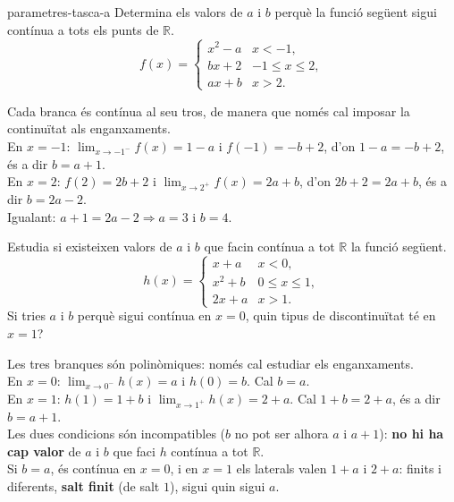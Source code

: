 \begin{apartats}

\begin{tria}{parametres-tasca-a}
Determina els valors de $a$ i $b$ perquè la funció següent sigui contínua a tots els
punts de $\mathbb{R}$.
\[
f(x)=\begin{cases}
  x^2-a & \si{x<-1},\\[3pt]
  bx+2  & \si{-1\le x\le 2},\\[3pt]
  ax+b  & \si{x>2}.
\end{cases}
\]

\begin{solucio}
Cada branca és contínua al seu tros, de manera que només cal imposar la continuïtat
als enganxaments.\\
En $x=-1$: $\lim_{x\to-1^-}f(x)=1-a$ i $f(-1)=-b+2$, d'on $1-a=-b+2$, és a dir $b=a+1$.\\
En $x=2$: $f(2)=2b+2$ i $\lim_{x\to2^+}f(x)=2a+b$, d'on $2b+2=2a+b$, és a dir $b=2a-2$.\\
Igualant: $a+1=2a-2\Rightarrow \boxed{a=3}$ i $\boxed{b=4}$.
\end{solucio}

Estudia si existeixen valors de $a$ i $b$ que facin contínua a tot $\mathbb{R}$ la funció
següent.
\[
h(x)=\begin{cases}
  x+a & \si{x<0},\\[3pt]
  x^2+b & \si{0\le x\le 1},\\[3pt]
  2x+a & \si{x>1}.
\end{cases}
\]
Si tries $a$ i $b$ perquè sigui contínua en $x=0$, quin tipus de discontinuïtat té en $x=1$?

\begin{solucio}
Les tres branques són polinòmiques: només cal estudiar els enganxaments.\\
En $x=0$: $\lim_{x\to0^-}h(x)=a$ i $h(0)=b$. Cal $b=a$.\\
En $x=1$: $h(1)=1+b$ i $\lim_{x\to1^+}h(x)=2+a$. Cal $1+b=2+a$, és a dir $b=a+1$.\\
Les dues condicions són incompatibles ($b$ no pot ser alhora $a$ i $a+1$): \textbf{no hi ha
cap valor} de $a$ i $b$ que faci $h$ contínua a tot $\mathbb{R}$.\\
Si $b=a$, és contínua en $x=0$, i en $x=1$ els laterals valen $1+a$ i $2+a$: finits i
diferents, \textbf{salt finit} (de salt $1$), sigui quin sigui $a$.
\end{solucio}
\end{tria}


\end{apartats}
